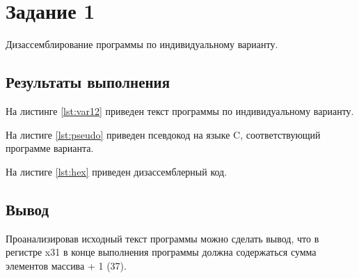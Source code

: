 \chapter{Задание 1}

Дизассемблирование программы по индивидуальному варианту.

\section{Результаты выполнения}

На листинге \ref{lst:var12} приведен текст программы по индивидуальному
варианту.


На листиге \ref{lst:pseudo} приведен псевдокод на языке C, соответствующий
программе варианта.


На листиге \ref{lst:hex} приведен дизассемблерный код.


\section{Вывод}

Проанализировав исходный текст программы можно сделать вывод, что в регистре
x31 в конце выполнения программы должна содержаться сумма элементов массива + 1
(37).
